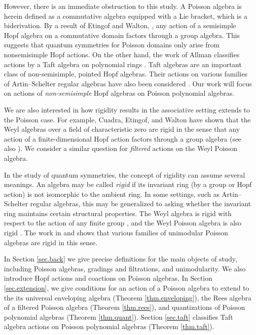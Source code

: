 \documentclass[reqno]{amsart}
\numberwithin{equation}{section}
\theoremstyle{definition}
\begin{document}
However, there is an immediate obstruction to this study. A Poisson algebra is herein defined as a commutative algebra equipped with a Lie bracket, which is a biderivation. By a result of Etingof and Walton, \cite{EW0}, any action of a semisimple Hopf algebra on a commutative domain factors through a group algebra. This suggests that quantum symmetries for Poisson domains only arise from nonsemisimple Hopf actions. On the other hand, the work of Allman classifies actions by a Taft algebra on polynomial rings \cite{All}. Taft algebras are an important class of non-semisimple, pointed Hopf algebras. Their actions on various families of Artin--Schelter regular algebras have also been considered \cite{CG,CGW,GWY}. Our work will focus on actions of \emph{non-semisimple} Hopf algebras on Poisson polynomial algebras.

We are also interested in how rigidity results in the associative setting extends to the Poisson case. For example, Cuadra, Etingof, and Walton have shown that the Weyl algebras over a field of characteristic zero are rigid in the sense that any action of a finite-dimensional Hopf action factors through a group algebra \cite{CEW2} (see also \cite{CWWZ2014,CEW1}). We consider a similar question for \emph{filtered} actions on the Weyl Poisson algebra.

In the study of quantum symmetries, the concept of rigidity can assume several meanings. 
An algebra may be called \emph{rigid} if its invariant ring (by a group or Hopf action) is not isomorphic to the ambient ring. In some settings, such as Artin--Schelter regular algebras, this may be generalized to asking whether the invariant ring maintains certain structural properties. The Weyl algebra is rigid with respect to the action of any finite group \cite{AP}, and the Weyl Poisson algebra is also rigid \cite[Theorem 1.1]{TIK2}. The work in \cite{cma1} and \cite{GVW} shows that various families of unimodular Poisson algebras are rigid in this sense.

In Section \ref{sec.back} we give precise definitions for the main objects of study, including Poisson algebras, gradings and filtrations, and unimodularity. We also introduce Hopf actions and coactions on Poisson algebras. In Section \ref{sec.extension}, we give conditions for an action of a Poisson algebra to extend to the its universal enveloping algebra (Theorem \ref{thm.enveloping}), the Rees algebra of a filtered Poisson algebra (Theorem \ref{thm.rees}), and quantizations of Poisson polynomial algebras (Theorem \ref{thm.quant}). Section \ref{sec.taft} classifies Taft algebra actions on Poisson polynomial algebras (Theorem \ref{thm.taft}).
\end{document}
